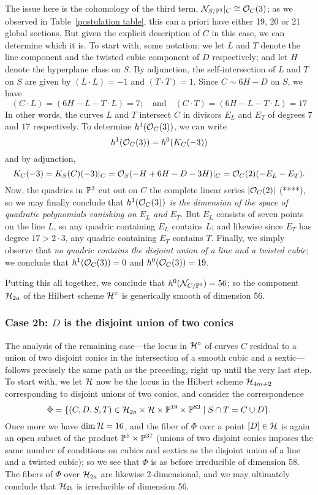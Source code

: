The issue here is the cohomology of the third term, $\cN_{S/\PP^3}|_C \cong \cO_C(3)$; as we observed in Table~\ref{postulation table}, this can a priori have either 19, 20 or 21 global sections. But given the explicit description of $C$ in this case, we can determine which it is. To start with, some notation: we let $L$ and $T$ denote the line component and the twisted cubic component of $D$ respectively; and let $H$ denote the hyperplane class on $S$. By adjunction, the self-intersection of $L$ and $T$ on $S$ are given by $(L \cdot L) = -1$ and $(T \cdot T) = 1$. Since $C \sim 6H - D$ on $S$, we have
$$
(C\cdot L) = (6H - L - T \cdot L) = 7; \quad \text{and} \quad (C\cdot T) = (6H - L - T \cdot L) = 17
$$
In other words, the curves $L$ and $T$ intersect $C$ in divisors $E_L$ and $E_T$ of degrees $7$ and $17$ respectively. To determine $h^1(\cO_C(3))$, we can write
$$
h^1(\cO_C(3)) = h^0(K_C(-3)) 
$$
and by adjunction,
$$
K_C(-3) = K_S(C)(-3)|_C = \cO_S(-H + 6H - D - 3H)|_C = \cO_C(2)(-E_L-E_T).
$$
Now, the quadrics in $\PP^3$ cut out on $C$ the complete linear series $|\cO_C(2)|$ (****), so we may finally conclude that \emph{$h^1(\cO_C(3))$ is the dimension of the space of quadratic polynomials vanishing on $E_L$ and $E_T$}. But $E_L$ consists of seven points on the line $L$, so any quadric containing $E_L$ contains $L$; and likewise since $E_T$ has degree $17 > 2\cdot 3$, any quadric containing $E_T$ contains $T$. Finally, we simply observe that \emph{no quadric contains the disjoint union of a line and a twisted cubic}; we conclude that $h^1(\cO_C(3))=0$ and $h^0(\cO_C(3)) = 19$.

Putting this all together, we conclude that $h^0(\cN_{C/\PP^3}) = 56$; so the component $\cH_{2a}$ of the Hilbert scheme $\cH^\circ$ is generically smooth of dimension 56.

\subsubsection{Case 2b: $D$ is the disjoint union of two conics}

The analysis of the remaining case---the locus in $\cH^\circ$ of curves $C$ residual to a union of two disjoint conics in the intersection of a smooth cubic and a sextic---follows precisely the same path as the preceding, right up until the very last step. To start with, we let $\cH$ now be the locus in the Hilbert scheme $\cH_{4m+2}$ corresponding to disjoint unions of two conics, and consider the correspondence
$$
\Phi = \{(C,D,S,T) \in \cH_{2a} \times \cH \times \PP^{19} \times \PP^{83} \mid S \cap T = C \cup D \}.
$$
Once more we have $\dim \cH = 16$, and the fiber of $\Phi$ over a point $[D] \in \cH$ is again an open subset of the product $\PP^5 \times \PP^{37}$ (unions of two disjoint conics imposes the same number of conditions on cubics and sextics as the disjoint union of a line and a twisted cubic); so we see that $\Phi$ is as before irreducible of dimension 58. The fibers of $\Phi$ over $ \cH_{2a}$ are likewise 2-dimensional, and we may ultimately conclude that $\cH_{2b}$ is irreducible of dimension 56.

